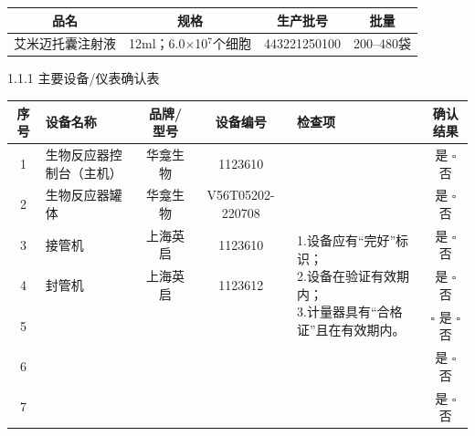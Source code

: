\documentclass[UTF8,10pt,a4paper,fontset=fandol]{ctexart}
\newcommand{\fieldvalue}[1]{#1}
\newcommand{\handwritten}[1]{#1}
\begin{document}
\begin{tabularx}{\textwidth}{|c|c|c|c|}
\hline
品名 & 规格 & 生产批号 & 批量 \\
\hline
艾米迈托囊注射液 & 12ml；6.0×10$^{7}$个细胞 & 
\fieldvalue{\handwritten{443221250100}} 
& 200--480袋 \\
\hline
\end{tabularx}

\vspace{0.5em}

1.1.1 主要设备/仪表确认表

\small
\begin{tabularx}{\textwidth}{|c|X|c|c|X|c|}
\hline
序号 & 设备名称 & 品牌/型号 & 设备编号 & 检查项 & 确认结果 \\
\hline
1 & 生物反应器控制台（主机） & 华龛生物 &
\fieldvalue{\handwritten{1123610}} &
\multirow{7}{=}{\parbox{0.22\textwidth}{1.设备应有“完好”标识；\\
2.设备在验证有效期内；\\
3.计量器具有“合格证”且在有效期内。}} &
\fieldvalue{是} \quad $\square$ 否 \\
\hline
2 & 生物反应器罐体 & 华龛生物 &
\fieldvalue{\handwritten{V56T05202-220708}} &
& 
\fieldvalue{是} \quad $\square$ 否 \\
\hline
3 & 接管机 & 上海英启 &
\fieldvalue{\handwritten{1123610}} &
&
\fieldvalue{是} \quad $\square$ 否 \\
\hline
4 & 封管机 & 上海英启 &
\fieldvalue{\handwritten{1123612}} &
&
\fieldvalue{是} \quad $\square$ 否 \\
\hline
5 & & & & &
$\square$ 是 \quad $\square$ 否 \\
\hline
6 & & & & &
\fieldvalue{是} \quad $\square$ 否 \\
\hline
7 & & & & &
\fieldvalue{是} \quad $\square$ 否 \\
\hline
\end{tabularx}
\normalsize
\end{document}
